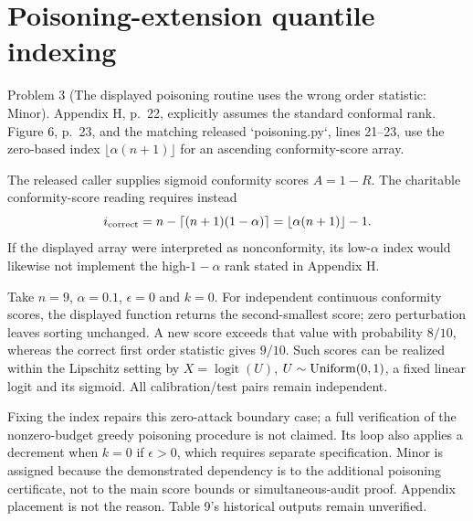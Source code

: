 \documentclass[10pt]{article}
\begin{document}
\section*{Poisoning-extension quantile indexing}
Problem 3 (The displayed poisoning routine uses the wrong order statistic: Minor).  Appendix H, p. 22, explicitly assumes the standard conformal rank. Figure 6, p. 23, and the matching released `poisoning.py`, lines 21–23, use the zero-based index \(\lfloor\alpha(n+1)\rfloor\) for an ascending conformity-score array.\par
The released caller supplies sigmoid conformity scores \(A=1-R\). The charitable conformity-score reading requires instead \[i_{\rm correct}
=n-\lceil(n+1)(1-\alpha)\rceil
=\lfloor\alpha(n+1)\rfloor-1.\] If the displayed array were interpreted as nonconformity, its low-\(\alpha\) index would likewise not implement the high-\(1-\alpha\) rank stated in Appendix H.\par
Take \(n=9\), \(\alpha=0.1\), \(\epsilon=0\) and \(k=0\). For independent continuous conformity scores, the displayed function returns the second-smallest score; zero perturbation leaves sorting unchanged. A new score exceeds that value with probability \(8/10\), whereas the correct first order statistic gives \(9/10\). Such scores can be realized within the Lipschitz setting by \(X=\operatorname{logit}(U)\), \(U\sim{\rm Uniform}(0,1)\), a fixed linear logit and its sigmoid. All calibration/test pairs remain independent.\par
Fixing the index repairs this zero-attack boundary case; a full verification of the nonzero-budget greedy poisoning procedure is not claimed. Its loop also applies a decrement when \(k=0\) if \(\epsilon>0\), which requires separate specification. Minor is assigned because the demonstrated dependency is to the additional poisoning certificate, not to the main score bounds or simultaneous-audit proof. Appendix placement is not the reason. Table 9’s historical outputs remain unverified.\par
\end{document}
